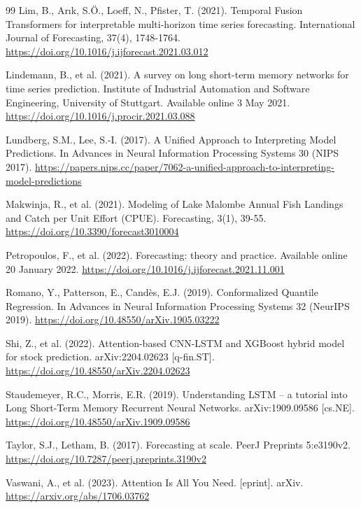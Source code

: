 \begin{thebibliography}{99}
Lim, B., Arık, S.Ö., Loeff, N., Pfister, T. (2021). Temporal Fusion Transformers for interpretable multi-horizon time series forecasting. International Journal of Forecasting, 37(4), 1748-1764. \url{https://doi.org/10.1016/j.ijforecast.2021.03.012}

Lindemann, B., et al. (2021). A survey on long short-term memory networks for time series prediction. Institute of Industrial Automation and Software Engineering, University of Stuttgart. Available online 3 May 2021. \url{https://doi.org/10.1016/j.procir.2021.03.088}

Lundberg, S.M., Lee, S.-I. (2017). A Unified Approach to Interpreting Model Predictions. In Advances in Neural Information Processing Systems 30 (NIPS 2017). \url{https://papers.nips.cc/paper/7062-a-unified-approach-to-interpreting-model-predictions}

Makwinja, R., et al. (2021). Modeling of Lake Malombe Annual Fish Landings and Catch per Unit Effort (CPUE). Forecasting, 3(1), 39-55. \url{https://doi.org/10.3390/forecast3010004}

Petropoulos, F., et al. (2022). Forecasting: theory and practice. Available online 20 January 2022. \url{https://doi.org/10.1016/j.ijforecast.2021.11.001}

Romano, Y., Patterson, E., Candès, E.J. (2019). Conformalized Quantile Regression. In Advances in Neural Information Processing Systems 32 (NeurIPS 2019). \url{https://doi.org/10.48550/arXiv.1905.03222}

Shi, Z., et al. (2022). Attention-based CNN-LSTM and XGBoost hybrid model for stock prediction. arXiv:2204.02623 [q-fin.ST]. \url{https://doi.org/10.48550/arXiv.2204.02623}

Staudemeyer, R.C., Morris, E.R. (2019). Understanding LSTM -- a tutorial into Long Short-Term Memory Recurrent Neural Networks. arXiv:1909.09586 [cs.NE]. \url{https://doi.org/10.48550/arXiv.1909.09586}

Taylor, S.J., Letham, B. (2017). Forecasting at scale. PeerJ Preprints 5:e3190v2. \url{https://doi.org/10.7287/peerj.preprints.3190v2}

Vaswani, A., et al. (2023). Attention Is All You Need. [eprint]. arXiv. \url{https://arxiv.org/abs/1706.03762}


\end{thebibliography}
